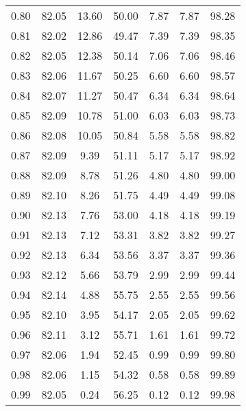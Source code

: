 \begin{tabular}{|c|c|c|c|c|c|c|}
      0.80 &     82.05 &     13.60 &      50.00 &    7.87 &       7.87 &         98.28 \\
      0.81 &     82.02 &     12.86 &      49.47 &    7.39 &       7.39 &         98.35 \\
      0.82 &     82.05 &     12.38 &      50.14 &    7.06 &       7.06 &         98.46 \\
      0.83 &     82.06 &     11.67 &      50.25 &    6.60 &       6.60 &         98.57 \\
      0.84 &     82.07 &     11.27 &      50.47 &    6.34 &       6.34 &         98.64 \\
      0.85 &     82.09 &     10.78 &      51.00 &    6.03 &       6.03 &         98.73 \\
      0.86 &     82.08 &     10.05 &      50.84 &    5.58 &       5.58 &         98.82 \\
      0.87 &     82.09 &      9.39 &      51.11 &    5.17 &       5.17 &         98.92 \\
      0.88 &     82.09 &      8.78 &      51.26 &    4.80 &       4.80 &         99.00 \\
      0.89 &     82.10 &      8.26 &      51.75 &    4.49 &       4.49 &         99.08 \\
      0.90 &     82.13 &      7.76 &      53.00 &    4.18 &       4.18 &         99.19 \\
      0.91 &     82.13 &      7.12 &      53.31 &    3.82 &       3.82 &         99.27 \\
      0.92 &     82.13 &      6.34 &      53.56 &    3.37 &       3.37 &         99.36 \\
      0.93 &     82.12 &      5.66 &      53.79 &    2.99 &       2.99 &         99.44 \\
      0.94 &     82.14 &      4.88 &      55.75 &    2.55 &       2.55 &         99.56 \\
      0.95 &     82.10 &      3.95 &      54.17 &    2.05 &       2.05 &         99.62 \\
      0.96 &     82.11 &      3.12 &      55.71 &    1.61 &       1.61 &         99.72 \\
      0.97 &     82.06 &      1.94 &      52.45 &    0.99 &       0.99 &         99.80 \\
      0.98 &     82.06 &      1.15 &      54.32 &    0.58 &       0.58 &         99.89 \\
      0.99 &     82.05 &      0.24 &      56.25 &    0.12 &       0.12 &         99.98 \\
\bottomrule
\end{tabular}

